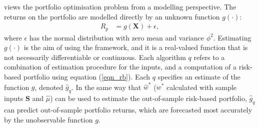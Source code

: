 \documentclass[a4paper,11pt,nocenter,bold,noupper,headcount]{mythesis}
\theoremstyle{plain}
\theoremstyle{definition}
\begin{document}
\cite{K18} views the portfolio optimisation problem from a modelling perspective. The returns on the portfolio are modelled directly by an unknown function $g(\cdot)$:
\begin{align} \label{ret_mod}
R_p & = g(\textbf{X}) + \epsilon,
\end{align}
where $\epsilon$ has the normal distribution with zero mean and variance $\phi^2$. Estimating $g(\cdot)$ is the aim of using the framework, and it is a real-valued function that is not necessarily differentiable or continuous. Each algorithm $q$ refers to a combination of estimation procedure for the inputs, and a computation of a risk-based portfolio using equation (\ref{eqn_rb}). Each $q$ specifies an estimate of the function $g$, denoted $\hat{g}_q$. In the same way that $\hat{w}^*$ ($w^*$ calculated with sample inputs $\textbf{S}$ and $\hat{\mu}$) can be used to estimate the out-of-sample risk-based portfolio, $\hat{g}_q$ can predict out-of-sample portfolio returns, which are forecasted most accurately by the unobservable function $g$.
\end{document}
